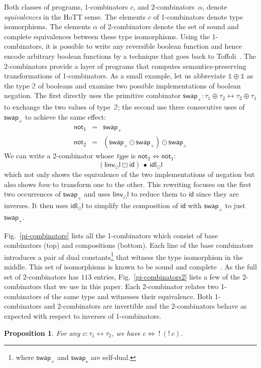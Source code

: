 \documentclass[a4paper,USenglish]{lipics-v2016-utf8x}
\newcommand{\iso}{\leftrightarrow}
\newcommand{\isotwo}{\Leftrightarrow}
\newcommand{\ot}{\mathbb{1}}
\newcommand{\swapp}{\mathsf{{swap_+}}}
\newcommand{\swapt}{\mathsf{{swap_{\star}}}}
\newcommand{\idiso}{\mathsf{{id}}}
\newcommand{\idldl}{\mathsf{{idl_{\odot}l}}}
\newcommand{\linvdl}{\mathsf{{linv_{\odot}l}}}
\newcommand{\idisotwo}{\mathsf{{id}}}
\newcommand{\transtwo}{\bullet}
\newcommand{\respstwo}{\mathsf{{\boxdot}}}
\newtheorem{proposition}{Proposition}
\begin{document}
\noindent Both classes of programs, 1-combinators $c$, and
2-combinators~$\alpha$, denote \emph{equivalences} in the HoTT sense. The
elements $c$ of 1-combinators denote type isomorphisms. The elements $\alpha$ of
2-combinators denote the set of sound and complete equivalences between these
type isomorphisms. Using the 1-combinators, it is possible to write any
reversible boolean function and hence encode arbitrary boolean functions by a
technique that goes back to Toffoli~\cite{Toffoli:1980}. The 2-combinators
provide a layer of programs that computes semantics-preserving transformations
of 1-combinators. As a small example, let us abbreviate $\ot \oplus \ot$ as the
type $\mathbb{2}$ of booleans and examine two possible implementations of
boolean negation. The first directly uses the primitive combinator
$\swapp : \tau_1 \oplus \tau_2 \iso \tau_2 \oplus \tau_1$ to exchange the two
values of type~$\mathbb{2}$; the second use three consecutive uses of $\swapp$
to achieve the same effect:
\[\begin{array}{rcl}
\mathsf{not_1} &=& \swapp \\
\mathsf{not_2} &=& (\swapp \odot \swapp) \odot \swapp
\end{array}\]
We can write a 2-combinator whose \emph{type} is $\mathsf{not_2}
\isotwo \mathsf{not_1}$:
\[
(\linvdl ~\respstwo~ \idisotwo)~\transtwo~\idldl
\]
which not only shows the equivalence of the two implementations of negation but
also shows \emph{how} to transform one to the other. This rewriting focuses
on the first two occurrences of $\swapp$ and uses $\linvdl$ to reduce them to
$\idiso$ since they are inverses. It then uses $\idldl$ to simplify the
composition of $\idiso$ with $\swapp$ to just $\swapp$.

Fig.~\ref{pi-combinators} lists all the 1-combinators which consist of base
combinators (top) and compositions (bottom). Each line of the base combinators
introduces a pair of dual constants\footnote{where $\swapp$ and $\swapt$ are
self-dual.} that witness the type isomorphism in the middle. This set of
isomorphisms is known to be sound and
complete~\cite{Fiore:2004,fiore-remarks}. As the full set of 2-combinators has
$113$ entries, Fig.~\ref{pi-combinators2} lists a few of the 2-combinators that
we use in this paper. Each 2-combinator relates two 1-combinators of the same
type and witnesses their equivalence. Both 1-combinators and 2-combinators are
invertible and the 2-combinators behave as expected with respect to inverses of
1-combinators.

\begin{proposition}
For any $c : \tau_1 \iso \tau_2$, we have $c \isotwo ~!~(!~c)$.
\end{proposition}
\end{document}
